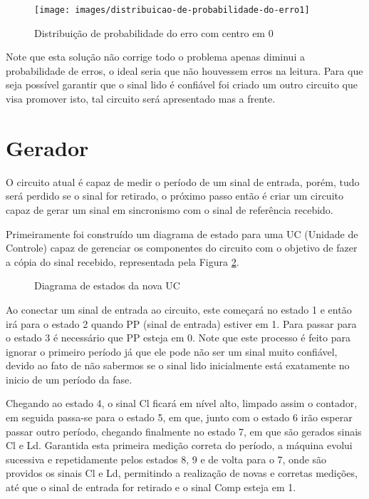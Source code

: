 \begin{figure}[!htp]
	\centering
	\caption{Distribuição de probabilidade do erro com centro em 0}
	\texttt{[image: images/distribuicao-de-probabilidade-do-erro1]}
	\label{fig:distribuicao-de-probabilidade-do-erro1}
\end{figure}

Note que esta solução não corrige todo o problema apenas diminui a probabilidade de erros, o ideal seria que não houvessem erros na leitura. Para que seja possível garantir que o sinal lido é confiável foi criado um outro circuito que visa promover isto, tal circuito será apresentado mas a frente.

\section{Gerador}

O circuito atual é capaz de medir o período de um sinal de entrada, porém, tudo será perdido se o sinal for retirado, o próximo passo então é criar um circuito capaz de gerar um sinal em sincronismo com o sinal de referência recebido. 

Primeiramente foi construído um diagrama de estado para uma UC (Unidade de Controle) capaz de gerenciar os componentes do circuito com o objetivo de fazer a cópia do sinal recebido, representada pela Figura \ref{fig:diagrama-de-estado1}.

\begin{figure}[!htp]
	\centering
	\caption{Diagrama de estados da nova UC}
	\label{fig:diagrama-de-estado1}
\end{figure}

Ao conectar um sinal de entrada ao circuito, este começará no estado 1 e então irá para o estado 2 quando PP (sinal de entrada) estiver em 1. Para passar para o estado 3 é necessário que PP esteja em 0. Note que este processo é feito para ignorar o primeiro período já que ele pode não ser um sinal muito confiável, devido ao fato de não sabermos se o sinal lido inicialmente está exatamente no inicio de um período da fase.

Chegando ao estado 4, o sinal Cl ficará em nível alto, limpado assim o contador, em seguida passa-se para o estado 5, em que, junto com o estado 6 irão esperar passar outro período, chegando finalmente no estado 7, em que são gerados sinais Cl e Ld. Garantida esta primeira medição correta do período, a máquina evolui sucessiva e repetidamente pelos estados 8, 9 e de volta para o 7, onde são providos os sinais Cl e Ld, permitindo a realização de novas e corretas medições, até que o sinal de entrada for retirado e o sinal Comp esteja em 1.

